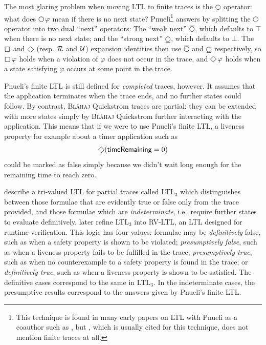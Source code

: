 \documentclass[sigplan,nonacm,10pt]{acmart}
\makeatletter
\newcommand{\Quickstrom}[0]{%
  \if@ACM@anonymous%
  \textsc{Bl\aa{}haj}%
  \else%
  Quickstrom%
  \fi\xspace}
\newcommand{\SNext}{\operatorname{%
  \tikz[baseline]{
    \draw[line width=.12ex]
      (0,.6ex) circle (.8ex);
      \draw[line width=.12ex] (-0.8ex,-0.4ex) -- (0.8ex,-0.4ex);
  }}}{}
\newcommand{\WNext}{\operatorname{%
  \tikz[baseline]{
    \draw[line width=.12ex]
      (0,.6ex) circle (.8ex);
      \draw[line width=.12ex] (-0.8ex,1.6ex) -- (0.8ex,1.6ex);
  }}}{}
\newcommand{\Next}{\operatorname{%
  \tikz[baseline]{
    \draw[line width=.12ex]
      (0,.6ex) circle (.8ex);
  }}}{}
\newcommand{\Eventually}{\operatorname{%
  \tikz[baseline]{
    \draw[line width=.12ex,line join=round]
      (0ex,.6ex) -- (.95ex,1.55ex) -- (1.9ex,.6ex) -- (.95ex,-.35ex) -- cycle;
  }}}{}
\newcommand{\Always}{\operatorname{%
  \tikz[baseline]{
    \draw[draw=white] (-0.2ex,0ex) -- (1.7ex,0ex);
    \draw[line width=.12ex,line join=round]
      (0ex,-.2ex) -- (0ex,1.3ex) -- (1.5ex,1.3ex) -- (1.5ex,.-.2ex) -- cycle;
  }}}{}
\newcommand{\Until}{\mathbin{%
  \mathcal{U}}}{}
\newcommand{\Release}{\mathbin{%
  \mathcal{R}}}{}
\makeatother
\begin{document}
The most glaring problem when moving LTL to finite traces is the $\Next$ operator: what does $\Next\varphi$ mean if there
is no next state? Pnueli\footnote{This technique is found in many early papers on LTL with Pnueli as a coauthor such as \citet{fltl}, but \citet{ltlsafety}, which is usually cited for this technique, does not mention finite traces at all.}
answers by splitting the $\Next$ operator into two dual ``next'' operators: The ``weak next'' $\WNext$, which
defaults to $\top$ when there is no next state; and the ``strong next'' $\SNext$, which defaults to $\bot$. The $\Always$ and $\Eventually$ (resp. $\Release$ and $\Until$)
expansion identities then use $\WNext$ and $\SNext$ respectively, so $\Always \varphi$ holds when a violation of $\varphi$ does not occur in the trace, and $\Eventually \varphi$
holds when a state satisfying $\varphi$ occurs at some point in the trace.

Pnueli's finite LTL is still defined for \emph{completed} traces, however. It assumes that the application terminates when the trace ends, and no further states could follow.
By contrast, \Quickstrom traces are partial: they can be extended with more states simply by \Quickstrom further interacting with the application. This means that if we were
to use Pnueli's finite LTL, a liveness property for example about a timer application such as $$\Eventually (\mathsf{timeRemaining} = 0)$$ could be marked as false simply because we didn't wait long enough for the
remaining time to reach zero.

\citet{ltl3} describe a tri-valued LTL for partial traces called LTL$_3$ which distinguishes between those formulae that are evidently true or false only from the trace provided, and those formulae which are \emph{indeterminate}, i.e.\ require
further states to evaluate definitively. \citet{rvltl} later refine LTL$_3$ into RV-LTL, an LTL designed for runtime verification. This logic has four values: formulae may be \emph{definitively} false, such as when a
safety property is shown to be violated; \emph{presumptively false}, such as when a liveness property fails to be fulfilled in the trace; \emph{presumptively true}, such as when
no counterexample to a safety property is found in the trace; or \emph{definitively true}, such as when a liveness property is shown to be satisfied. The definitive cases correspond to the same in LTL$_3$.
In the indeterminate cases, the presumptive results correspond to the answers given by Pnueli's finite LTL.
\end{document}
